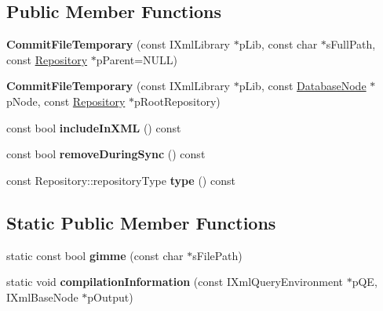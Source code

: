 \subsection*{\-Public \-Member \-Functions}
\begin{DoxyCompactItemize}
\item 
\hypertarget{classgeneral__server_1_1CommitFileTemporary_afa56dc2c8b2ef320eedfbf98b906eade}{{\bfseries \-Commit\-File\-Temporary} (const \-I\-Xml\-Library $\ast$p\-Lib, const char $\ast$s\-Full\-Path, const \hyperlink{classgeneral__server_1_1Repository}{\-Repository} $\ast$p\-Parent=\-N\-U\-L\-L)}\label{classgeneral__server_1_1CommitFileTemporary_afa56dc2c8b2ef320eedfbf98b906eade}

\item 
\hypertarget{classgeneral__server_1_1CommitFileTemporary_aa5b5affba5cbd84b87ff0bb05fe27684}{{\bfseries \-Commit\-File\-Temporary} (const \-I\-Xml\-Library $\ast$p\-Lib, const \hyperlink{classgeneral__server_1_1DatabaseNode}{\-Database\-Node} $\ast$p\-Node, const \hyperlink{classgeneral__server_1_1Repository}{\-Repository} $\ast$p\-Root\-Repository)}\label{classgeneral__server_1_1CommitFileTemporary_aa5b5affba5cbd84b87ff0bb05fe27684}

\item 
\hypertarget{classgeneral__server_1_1CommitFileTemporary_a86fce799378db169c281c8159a288653}{const bool {\bfseries include\-In\-X\-M\-L} () const }\label{classgeneral__server_1_1CommitFileTemporary_a86fce799378db169c281c8159a288653}

\item 
\hypertarget{classgeneral__server_1_1CommitFileTemporary_aa43a4f73ae1cf9f6ba5d8a071ef6d410}{const bool {\bfseries remove\-During\-Sync} () const }\label{classgeneral__server_1_1CommitFileTemporary_aa43a4f73ae1cf9f6ba5d8a071ef6d410}

\item 
\hypertarget{classgeneral__server_1_1CommitFileTemporary_a4c3e77d4cea0ad58ebc3582ab47a9090}{const \-Repository\-::repository\-Type {\bfseries type} () const }\label{classgeneral__server_1_1CommitFileTemporary_a4c3e77d4cea0ad58ebc3582ab47a9090}

\end{DoxyCompactItemize}
\subsection*{\-Static \-Public \-Member \-Functions}
\begin{DoxyCompactItemize}
\item 
\hypertarget{classgeneral__server_1_1CommitFileTemporary_ae31f7ead84193da71ff62357077e1d5d}{static const bool {\bfseries gimme} (const char $\ast$s\-File\-Path)}\label{classgeneral__server_1_1CommitFileTemporary_ae31f7ead84193da71ff62357077e1d5d}

\item 
\hypertarget{classgeneral__server_1_1CommitFileTemporary_a7a42d82bc35c7a95ef2cf6c7fa83c3de}{static void {\bfseries compilation\-Information} (const \-I\-Xml\-Query\-Environment $\ast$p\-Q\-E, \-I\-Xml\-Base\-Node $\ast$p\-Output)}\label{classgeneral__server_1_1CommitFileTemporary_a7a42d82bc35c7a95ef2cf6c7fa83c3de}

\end{DoxyCompactItemize}
